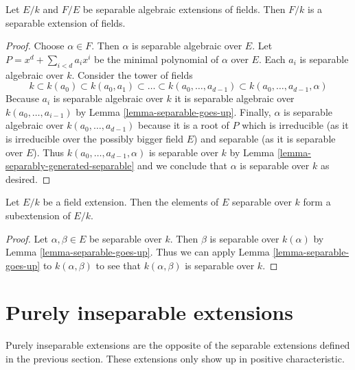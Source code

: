\begin{lemma}
\label{lemma-separable-permanence}
Let $E/k$ and $F/E$ be separable algebraic extensions of fields. Then $F/k$
is a separable extension of fields.
\end{lemma}

\begin{proof}
Choose $\alpha \in F$. Then $\alpha$ is separable algebraic over $E$.
Let $P = x^d + \sum_{i < d} a_i x^i$ be the minimal polynomial of
$\alpha$ over $E$. Each $a_i$ is separable algebraic over $k$.
Consider the tower of fields
$$
k \subset k(a_0) \subset k(a_0, a_1) \subset \ldots \subset
k(a_0, \ldots, a_{d - 1}) \subset k(a_0, \ldots, a_{d - 1}, \alpha)
$$
Because $a_i$ is separable algebraic over $k$ it is separable algebraic
over $k(a_0, \ldots, a_{i - 1})$ by Lemma \ref{lemma-separable-goes-up}.
Finally, $\alpha$ is separable algebraic over $k(a_0, \ldots, a_{d - 1})$
because it is a root of $P$ which is irreducible
(as it is irreducible over the possibly bigger field $E$)
and separable (as it is separable over $E$).
Thus $k(a_0, \ldots, a_{d - 1}, \alpha)$ is separable over $k$
by Lemma \ref{lemma-separably-generated-separable}
and we conclude that $\alpha$ is separable over $k$ as desired.
\end{proof}

\begin{lemma}
\label{lemma-separable-elements}
Let $E/k$ be a field extension. Then the elements of $E$ separable
over $k$ form a subextension of $E/k$.
\end{lemma}

\begin{proof}
Let $\alpha, \beta \in E$ be separable over $k$. Then $\beta$ is separable
over $k(\alpha)$ by Lemma \ref{lemma-separable-goes-up}.
Thus we can apply Lemma \ref{lemma-separable-goes-up} to $k(\alpha, \beta)$
to see that $k(\alpha, \beta)$ is separable over $k$.
\end{proof}






\section{Purely inseparable extensions}
\label{section-purely-inseparable}

\noindent
Purely inseparable extensions are the opposite of the separable
extensions defined in the previous section. These extensions only
show up in positive characteristic.

